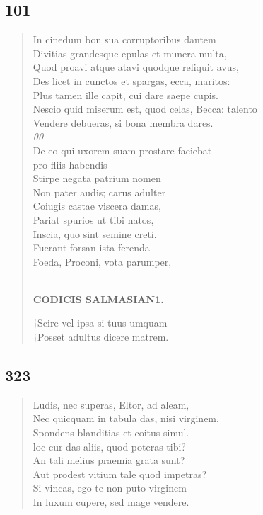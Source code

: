 \documentclass[11pt, a4paper]{report}
\begin{document}
            \subsection*{101}
      \begin{verse}
      In cinedum bon sua corruptoribus dantem \\ Divitias grandesque epulas et munera multa, \\ Quod proavi atque atavi quodque reliquit avus, \\ Des licet in cunctos et spargas, ecca, maritos: \\ Plus tamen ille capit, cui dare saepe cupis. \\ Nescio quid miserum est, quod celas, Becca: talento \\ Vendere debueras, si bona membra dares. \\ \textit{00} \\ De eo qui uxorem suam prostare faeiebat \\ pro fliis habendis \\ Stirpe negata patrium nomen \\ Non pater audis; carus adulter \\ Coiugis castae viscera damas, \\ Pariat spurios ut tibi natos, \\ Inscia, quo sint semine creti. \\ Fuerant forsan ista ferenda \\ Foeda, Proconi, vota parumper, \\ 
        ﻿\pagebreak 
    \begin{center} \textbf{CODICIS SALMASIAN1.} \end{center} \marginpar{[265]} †Scire vel ipsa si tuus umquam \\ †Posset adultus dicere matrem. \\ 
      \end{verse}
  
            \subsection*{323}
      \begin{verse}
      Ludis, nec superas, Eltor, ad aleam, \\ Nec quicquam in tabula das, nisi virginem, \\ Spondens blanditias et coitus simul. \\ loc cur das aliis, quod poteras tibi? \\ An tali melius praemia grata sunt? \\ Aut prodest vitium tale quod impetras? \\ Si vincas, ego te non puto virginem \\ In luxum cupere, sed mage vendere. \\ 
      \end{verse}
  
\end{document}
